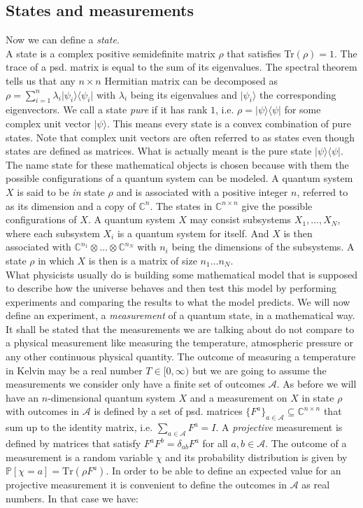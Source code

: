 \subsection{States and measurements}
Now we can define a \emph{state}.\\
A state is a complex positive semidefinite matrix $\rho$ that satisfies Tr$(\rho)=1$. The trace of a psd. matrix is equal to the sum of its eigenvalues. The spectral theorem tells us that any $n \times n $ Hermitian matrix can be decomposed as $\rho = \sum_{i=1}^n \lambda_i \vert \psi_i \rangle \langle \psi_i \vert$ with $\lambda_i$ being its eigenvalues and $\vert \psi_i \rangle$ the corresponding eigenvectors. We call a state \emph{pure} if it has rank $1$, i.e. $ \rho = \vert \psi \rangle \langle \psi \vert$ for some complex unit vector $\vert \psi \rangle$. This means every state is a convex combination of pure states. Note that complex unit vectors are often referred to as states even though states are defined as matrices. What is actually meant is the pure state $\vert \psi \rangle \langle \psi \vert$. The name state for these mathematical objects is chosen because with them the possible configurations of a quantum system can be modeled. A quantum system $X$ is said to be \textit{in} state $\rho$ and is associated with a positive integer $n$, referred to as its dimension and a copy of $\mathbb{C}^n$. The states in $\mathbb{C}^{n \times n}$ give the possible configurations of $X$. A quantum system $X$ may consist subsystems $X_1, \dots , X_N$, where each subsystem $X_i$ is a quantum system for itself. And $X$ is then associated with $\mathbb{C}^{n_1}\otimes \dots \otimes \mathbb{C}^{n_N}$ with $n_i$ being the dimensions of the subsystems. A state $\rho$ in which $X$ is then is a matrix of size $n_1\dots n_N$. \\
What physicists usually do is building some mathematical model that is supposed to describe how the universe behaves and then test this model by performing experiments and comparing the results to what the model predicts. We will now define an experiment, a \emph{measurement} of a quantum state, in a mathematical way. It shall be stated that the measurements we are talking about do not compare to a physical measurement like measuring the temperature, atmospheric pressure or any other continuous physical quantity. The outcome of measuring a temperature in Kelvin may be a real number $T \in [0 , \infty)$ but we are going to assume the measurements we consider only have a finite set of outcomes $\mathcal{A}$. As before we will have an $n$-dimensional quantum system $X$ and a measurement on $X$ in state $\rho$ with outcomes in $\mathcal{A}$ is defined by a set of psd. matrices $\{ F^a \}_{a \in \mathcal{A}} \subseteq \mathbb{C}^{n \times n}$ that sum up to the identity matrix, i.e. $\sum_{a \in \mathcal{A}} F^a = I$. A \emph{projective} measurement is defined by matrices that satisfy $F^aF^b = \delta_{ab}F^a$ for all $a,b \in \mathcal{A}$. The outcome of a measurement is a random variable $\chi$ and its probability distribution is given by $\mathbb{P} \left[ \chi = a \right] = \text{Tr}(\rho F^a)$. In order to be able to define an expected value for an projective measurement it is convenient to define the outcomes in $\mathcal{A}$ as real numbers. In that case we have: 
